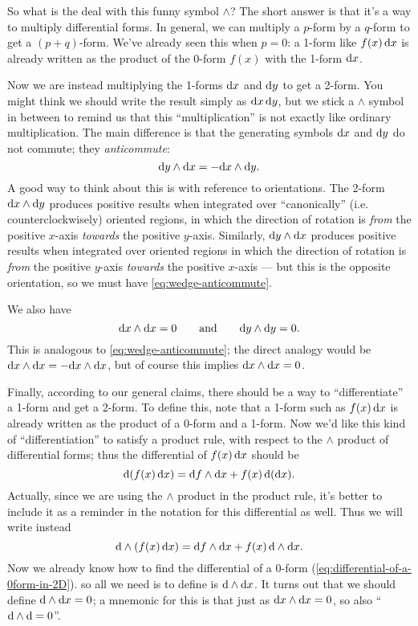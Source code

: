 \documentclass[12pt]{amsart}
\begin{document}
So what is the deal with this funny symbol $\wedge$?
The short answer is that it's a way to multiply differential forms.
In general, we can multiply a $p$-form by a $q$-form to get a $(p+q)$-form.
We've already seen this when $p=0$: a 1-form like $f(x)\,{\mathrm{d} x}$ is already written as the product of the 0-form $f(x)$ with the 1-form ${\mathrm{d} x}$.

Now we are instead multiplying the 1-forms ${\mathrm{d} x}$ and ${\mathrm{d} y}$ to get a 2-form.
You might think we should write the result simply as ${\mathrm{d} x}\,{\mathrm{d} y}$, but we stick a $\wedge$ symbol in between to remind us that this ``multiplication'' is not exactly like ordinary multiplication.
The main difference is that the generating symbols ${\mathrm{d} x}$ and ${\mathrm{d} y}$ do not commute; they \emph{anticommute}:
\begin{equation}
  {\ensuremath{\mathrm{d} y}}\wedge{\ensuremath{\mathrm{d} x}} = - {\mathrm{d} x}\wedge {\ensuremath{\mathrm{d} y}}.\label{eq:wedge-anticommute}
\end{equation}
A good way to think about this is with reference to orientations.
The 2-form ${\mathrm{d} x}\wedge{\ensuremath{\mathrm{d} y}}$ produces positive results when integrated over ``canonically'' (i.e. counterclockwisely) oriented regions, in which the direction of rotation is \emph{from} the positive $x$-axis \emph{towards} the positive $y$-axis.
Similarly, ${\mathrm{d} y}\wedge{\ensuremath{\mathrm{d} x}}$ produces positive results when integrated over oriented regions in which the direction of rotation is \emph{from} the positive $y$-axis \emph{towards} the positive $x$-axis --- but this is the opposite orientation, so we must have \cref{eq:wedge-anticommute}.

We also have
\[ {\mathrm{d} x} \wedge {\ensuremath{\mathrm{d} x}} = 0 \qquad\text{and}\qquad {\ensuremath{\mathrm{d} y}}\wedge {\ensuremath{\mathrm{d} y}} = 0. \]
This is analogous to \cref{eq:wedge-anticommute}; the direct analogy would be ${\mathrm{d} x}\wedge{\ensuremath{\mathrm{d} x}} = - {\mathrm{d} x}\wedge{\ensuremath{\mathrm{d} x}}$, but of course this implies ${\mathrm{d} x}\wedge{\ensuremath{\mathrm{d} x}}=0$.

Finally, according to our general claims, there should be a way to ``differentiate'' a 1-form and get a 2-form.
To define this, note that a 1-form such as $f(x)\,{\mathrm{d} x}$ is already written as the product of a 0-form and a 1-form.
Now we'd like this kind of ``differentiation'' to satisfy a product rule, with respect to the $\wedge$ product of differential forms; thus the differential of $f(x)\,{\mathrm{d} x}$ should be
\[ \mathrm{d}(f(x)\,{\mathrm{d} x}) =  {\mathrm{d} f} \wedge{\ensuremath{\mathrm{d} x}} + f(x)\, \mathrm{d}({\mathrm{d} x}). \]
Actually, since we are using the $\wedge$ product in the product rule, it's better to include it as a reminder in the notation for this differential as well.
Thus we will write instead
\[ \mathrm{d}\wedge(f(x)\,{\mathrm{d} x}) =  {\mathrm{d} f} \wedge{\ensuremath{\mathrm{d} x}} + f(x)\, \mathrm{d}\wedge{\ensuremath{\mathrm{d} x}}. \]
Now we already know how to find the differential of a 0-form (\cref{eq:differential-of-a-0form-in-2D}). so all we need is to define is $\mathrm{d}\wedge{\ensuremath{\mathrm{d} x}}$.
It turns out that we should define $\mathrm{d}\wedge{\ensuremath{\mathrm{d} x}}=0$; a mnemonic for this is that just as ${\mathrm{d} x}\wedge {\ensuremath{\mathrm{d} x}} = 0$, so also ``$\mathrm{d}\wedge\mathrm{d} = 0$''.
\end{document}
